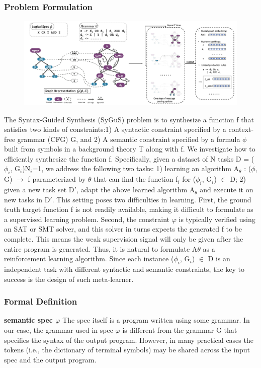 \documentclass{article}
\begin{document}
\subsubsection{Problem Formulation}
\begin{figure}[ht]
\vskip 0.2in
\begin{center}
\centerline{\includegraphics[width=\columnwidth]{Images/Synthesis1-1.png}}
\label{icml-historical}
\end{center}
\vskip -0.2in
\end{figure}
The Syntax-Guided Synthesis (SyGuS) problem is to synthesize a function f that satisfies two kinds of constraints:1) A syntactic constraint specified by a context-free grammar (CFG) G, and 2) A semantic constraint specified by a formula $\phi$ built from symbols in a background theory T along with f. We investigate how to efficiently synthesize the function f. Specifically, given a dataset of N tasks D = {($\phi_i$, G$_i$)}N$_i$=1, we address the following two tasks: 1) learning an algorithm A$_\theta$ : ($\phi$, G) $\rightarrow$ f parameterized by $\theta$ that can find the function f$_i$ for ($\phi_i$, G$_i$) $\in$ D; 2) given a new task set D$'$, adapt the above learned algorithm A$_\theta$ and execute it on new tasks in D$'$. This setting poses two difficulties in learning. First, the ground truth target function f is not readily available, making it difficult to formulate as a supervised learning problem. Second, the constraint $\varphi$ is typically verified using an SAT or SMT solver, and this solver in turns expects the generated f to be complete. This means the weak supervision signal will only be given after the entire program is generated. Thus, it is natural to formulate A$\theta$ as a reinforcement learning algorithm. Since each instance ($\phi_i$, G$_i$) $\in$ D is an independent task with different syntactic and semantic constraints, the key to success is the design of such meta-learner.
\subsubsection{Formal Definition}
\textbf{semantic spec $\varphi$} The spec itself is a program written using some grammar. In our case, the grammar used in spec $\varphi$ is different from the grammar G that specifies the syntax of the output program. However, in many practical cases the tokens (i.e., the dictionary of terminal symbols) may be shared across the input spec and the output program.
\end{document}
